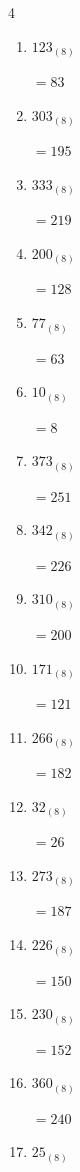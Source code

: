 \begin{multicols}{4}
\begin{enumerate}
  \item $123_{(8)}$

        $=83$

  \item $303_{(8)}$

        $=195$

  \item $333_{(8)}$

        $=219$

  \item $200_{(8)}$

        $=128$

  \item $77_{(8)}$

        $=63$

  \item $10_{(8)}$

        $=8$

  \item $373_{(8)}$

        $=251$

  \item $342_{(8)}$

        $=226$

  \item $310_{(8)}$

        $=200$

  \item $171_{(8)}$

        $=121$

  \item $266_{(8)}$

        $=182$

\columnbreak %

  \item $32_{(8)}$

        $=26$

  \item $273_{(8)}$

        $=187$

  \item $226_{(8)}$

        $=150$

  \item $230_{(8)}$

        $=152$

  \item $360_{(8)}$

        $=240$

  \item $25_{(8)}$


\end{enumerate}
\end{multicols}
